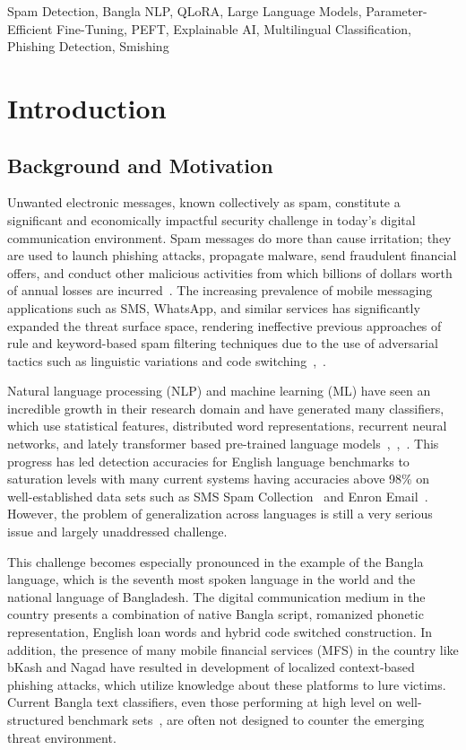 \documentclass[journal]{IEEEtran}
\begin{document}
\begin{IEEEkeywords}
Spam Detection, Bangla NLP, QLoRA, Large Language Models, Parameter-Efficient Fine-Tuning, PEFT, Explainable AI, Multilingual Classification, Phishing Detection, Smishing
\end{IEEEkeywords}

\section{Introduction}

\subsection{Background and Motivation}

Unwanted electronic messages, known collectively as spam, constitute a
significant and economically impactful security challenge in today's
digital communication environment. Spam messages do more than cause
irritation; they are used to launch phishing attacks, propagate malware,
send fraudulent financial offers, and conduct other malicious activities
from which billions of dollars worth of annual losses are incurred~\cite{ref1}. The increasing prevalence of mobile messaging applications such
as SMS, WhatsApp, and similar services has significantly expanded the
threat surface space, rendering ineffective previous approaches of rule
and keyword-based spam filtering techniques due to the use of
adversarial tactics such as linguistic variations and code switching~\cite{ref5},~\cite{ref6}.

Natural language processing (NLP) and machine learning (ML) have seen an incredible growth in their research domain and have generated many classifiers, which use statistical features, distributed word representations, recurrent neural networks, and lately transformer based pre-trained language models~\cite{ref4},~\cite{ref7},~\cite{ref9}. This progress has led detection accuracies for English language benchmarks to saturation levels with many current systems having accuracies above 98\% on well-established data sets such as SMS Spam Collection~\cite{ref1} and Enron Email~\cite{ref9}. However, the problem of generalization across languages is still a very serious issue and largely unaddressed challenge.

This challenge becomes especially pronounced in the example of the Bangla language, which is the seventh most spoken language in the world and the national language of Bangladesh. The digital communication medium in the country presents a combination of native Bangla script, romanized phonetic representation, English loan words and hybrid code switched construction. In addition, the presence of many mobile financial services (MFS) in the country like bKash and Nagad have resulted in development of localized context-based phishing attacks, which utilize knowledge about these platforms to lure victims. Current Bangla text classifiers, even those performing at high level on well-structured benchmark sets~\cite{ref7}, are often not designed to counter the emerging threat environment.
\end{document}
